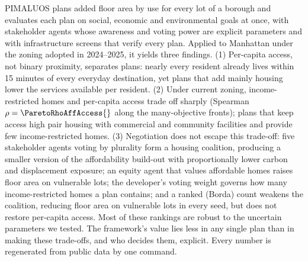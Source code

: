 \documentclass[preprint,12pt]{elsarticle}
\begin{document}
PIMALUOS plans added floor area by use for every lot of a borough and evaluates each plan on social, economic and environmental goals at once, with stakeholder agents whose awareness and voting power are explicit parameters and with infrastructure screens that verify every plan. Applied to Manhattan under the zoning adopted in 2024--2025, it yields three findings. (1) Per-capita access, not binary proximity, separates plans: nearly every resident already lives within 15 minutes of every everyday destination, yet plans that add mainly housing lower the services available per resident. (2) Under current zoning, income-restricted homes and per-capita access trade off sharply (Spearman $\rho=\ParetoRhoAffAccess{}$ along the many-objective fronts); plans that keep access high pair housing with commercial and community facilities and provide few income-restricted homes. (3) Negotiation does not escape this trade-off: five stakeholder agents voting by plurality form a housing coalition, producing a smaller version of the affordability build-out with proportionally lower carbon and displacement exposure; an equity agent that values affordable homes raises floor area on vulnerable lots; the developer's voting weight governs how many income-restricted homes a plan contains; and a ranked (Borda) count weakens the coalition, reducing floor area on vulnerable lots in every seed, but does not restore per-capita access. Most of these rankings are robust to the uncertain parameters we tested. The framework's value lies less in any single plan than in making these trade-offs, and who decides them, explicit. Every number is regenerated from public data by one command.

\end{document}

